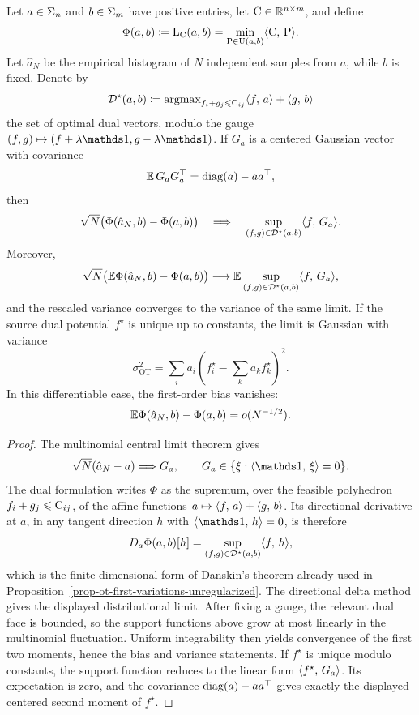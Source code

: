 \begin{prop}\label{prop-finite-ot-clt}
	Let \(a\in\Sigma_n\) and \(b\in\Sigma_m\) have positive entries, let \(\mathrm{C}\in\mathbb{R}^{n\times m}\), and define
	\[
		\Phi(a,b)\coloneqq \mathrm{L}_{\mathrm{C}}(a,b)
		=
		\min_{\mathrm{P}\in\mathrm{U}(a,b)}\langle \mathrm{C},\,\mathrm{P}\rangle.
	\]
	Let \(\hat a_N\) be the empirical histogram of \(N\) independent samples from \(a\), while \(b\) is fixed.  Denote by
	\[
		\mathcal D^\star(a,b)
		\coloneqq
		\operatorname{argmax}_{f_i+g_j\leqslant \mathrm{C}_{ij}}
		\langle f,\,a\rangle+\langle g,\,b\rangle
	\]
	the set of optimal dual vectors, modulo the gauge \((f,g)\mapsto(f+\lambda\ones,g-\lambda\ones)\).  If \(G_a\) is a centered Gaussian vector with covariance
	\[
		\mathbb{E}\,G_aG_a^\top=\operatorname{diag}(a)-aa^\top,
	\]
	then
	\[
		\sqrt N\big(\Phi(\hat a_N,b)-\Phi(a,b)\big)
		\quad\Longrightarrow\quad
		\sup_{(f,g)\in\mathcal D^\star(a,b)}\langle f,\,G_a\rangle.
	\]
	Moreover,
	\[
		\sqrt N\big(\mathbb{E}\Phi(\hat a_N,b)-\Phi(a,b)\big)
		\longrightarrow
		\mathbb{E}\sup_{(f,g)\in\mathcal D^\star(a,b)}\langle f,\,G_a\rangle,
	\]
	and the rescaled variance converges to the variance of the same limit. 
	If the source dual potential \(f^\star\) is unique up to constants, the limit is Gaussian with variance
	\[
		\sigma_{\mathrm{OT}}^2
		=
		\sum_i a_i
		\left(f^\star_i-\sum_k a_k f^\star_k\right)^2.
	\]
	In this differentiable case, the first-order bias vanishes:
	\[
		\mathbb{E}\Phi(\hat a_N,b)-\Phi(a,b)=o(N^{-1/2}).
	\]
\end{prop}

\begin{proof}
	The multinomial central limit theorem gives
	\[
		\sqrt N(\hat a_N-a)\Longrightarrow G_a,
		\qquad
		G_a\in\{\xi:\dotp{\ones}{\xi}=0\}.
	\]
	The dual formulation writes \(\Phi\) as the supremum, over the feasible polyhedron \(f_i+g_j\leqslant \mathrm{C}_{ij}\), of the affine functions \(a\mapsto \langle f,\,a\rangle+\langle g,\,b\rangle\).  Its directional derivative at \(a\), in any tangent direction \(h\) with \(\dotp{\ones}{h}=0\), is therefore
	\[
		D_a\Phi(a,b)[h]
		=
		\sup_{(f,g)\in\mathcal D^\star(a,b)}\langle f,\,h\rangle,
	\]
	which is the finite-dimensional form of Danskin's theorem already used in Proposition~\ref{prop-ot-first-variations-unregularized}.  The directional delta method gives the displayed distributional limit.  After fixing a gauge, the relevant dual face is bounded, so the support functions above grow at most linearly in the multinomial fluctuation.  Uniform integrability then yields convergence of the first two moments, hence the bias and variance statements.  If \(f^\star\) is unique modulo constants, the support function reduces to the linear form \(\langle f^\star,\,G_a\rangle\).  Its expectation is zero, and the covariance \(\operatorname{diag}(a)-aa^\top\) gives exactly the displayed centered second moment of \(f^\star\).
\end{proof}

